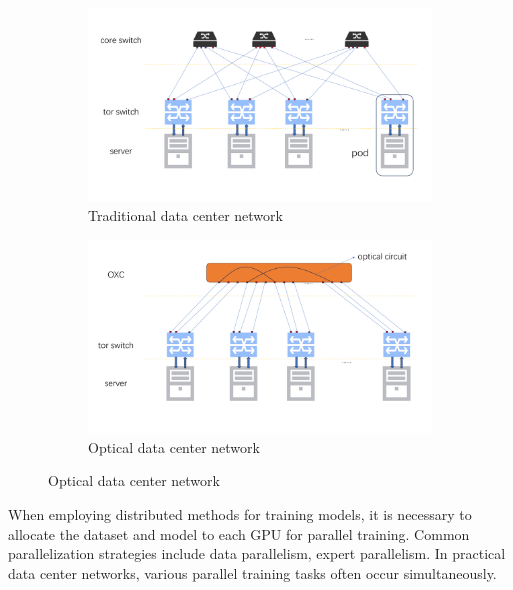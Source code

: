 \documentclass[conference]{IEEEtran}
\begin{document}
\begin{figure}[htbp]
	\centering
	\begin{subfigure}
		\centering
		\includegraphics[width=\linewidth]{./figure/picture1.pdf}
		\caption{Traditional data center network}
		\label{fig:sub1}
	\end{subfigure}
	\begin{subfigure}
		\centering
		\includegraphics[width=\linewidth]{./figure/picture2.pdf}
		\caption{Optical data center network}
		\label{fig:sub2}
	\end{subfigure}
	\label{fig:total}
\end{figure}



When employing distributed methods for training models, it is necessary to allocate the dataset and model to each GPU for parallel training. Common parallelization strategies include data parallelism, expert parallelism. In practical data center networks, various parallel training tasks often occur simultaneously.
\end{document}
